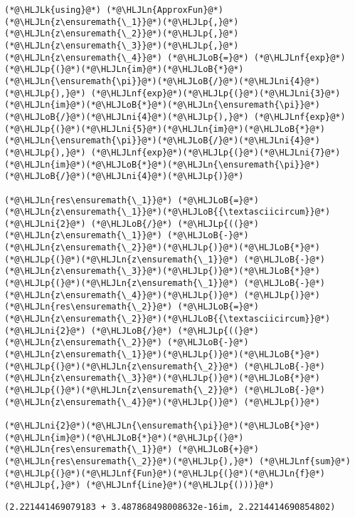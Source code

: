 \documentclass[12pt,a4paper]{article}
\newcommand{\HLJLk}[1]{\textcolor[RGB]{148,91,176}{\textbf{#1}}}
\newcommand{\HLJLn}[1]{#1}
\newcommand{\HLJLnf}[1]{\textcolor[RGB]{66,102,213}{#1}}
\newcommand{\HLJLni}[1]{\textcolor[RGB]{59,151,46}{#1}}
\newcommand{\HLJLoB}[1]{\textcolor[RGB]{102,102,102}{\textbf{#1}}}
\newcommand{\HLJLp}[1]{#1}
\begin{document}
\begin{lstlisting}
(*@\HLJLk{using}@*) (*@\HLJLn{ApproxFun}@*)
(*@\HLJLn{z\ensuremath{\_1}}@*)(*@\HLJLp{,}@*)(*@\HLJLn{z\ensuremath{\_2}}@*)(*@\HLJLp{,}@*)(*@\HLJLn{z\ensuremath{\_3}}@*)(*@\HLJLp{,}@*)(*@\HLJLn{z\ensuremath{\_4}}@*) (*@\HLJLoB{=}@*) (*@\HLJLnf{exp}@*)(*@\HLJLp{(}@*)(*@\HLJLn{im}@*)(*@\HLJLoB{*}@*)(*@\HLJLn{\ensuremath{\pi}}@*)(*@\HLJLoB{/}@*)(*@\HLJLni{4}@*)(*@\HLJLp{),}@*) (*@\HLJLnf{exp}@*)(*@\HLJLp{(}@*)(*@\HLJLni{3}@*)(*@\HLJLn{im}@*)(*@\HLJLoB{*}@*)(*@\HLJLn{\ensuremath{\pi}}@*)(*@\HLJLoB{/}@*)(*@\HLJLni{4}@*)(*@\HLJLp{),}@*) (*@\HLJLnf{exp}@*)(*@\HLJLp{(}@*)(*@\HLJLni{5}@*)(*@\HLJLn{im}@*)(*@\HLJLoB{*}@*)(*@\HLJLn{\ensuremath{\pi}}@*)(*@\HLJLoB{/}@*)(*@\HLJLni{4}@*)(*@\HLJLp{),}@*) (*@\HLJLnf{exp}@*)(*@\HLJLp{(}@*)(*@\HLJLni{7}@*)(*@\HLJLn{im}@*)(*@\HLJLoB{*}@*)(*@\HLJLn{\ensuremath{\pi}}@*)(*@\HLJLoB{/}@*)(*@\HLJLni{4}@*)(*@\HLJLp{)}@*)

(*@\HLJLn{res\ensuremath{\_1}}@*) (*@\HLJLoB{=}@*) (*@\HLJLn{z\ensuremath{\_1}}@*)(*@\HLJLoB{{\textasciicircum}}@*)(*@\HLJLni{2}@*) (*@\HLJLoB{/}@*) (*@\HLJLp{((}@*)(*@\HLJLn{z\ensuremath{\_1}}@*) (*@\HLJLoB{-}@*) (*@\HLJLn{z\ensuremath{\_2}}@*)(*@\HLJLp{)}@*)(*@\HLJLoB{*}@*)(*@\HLJLp{(}@*)(*@\HLJLn{z\ensuremath{\_1}}@*) (*@\HLJLoB{-}@*) (*@\HLJLn{z\ensuremath{\_3}}@*)(*@\HLJLp{)}@*)(*@\HLJLoB{*}@*)(*@\HLJLp{(}@*)(*@\HLJLn{z\ensuremath{\_1}}@*) (*@\HLJLoB{-}@*) (*@\HLJLn{z\ensuremath{\_4}}@*)(*@\HLJLp{)}@*) (*@\HLJLp{)}@*)
(*@\HLJLn{res\ensuremath{\_2}}@*) (*@\HLJLoB{=}@*) (*@\HLJLn{z\ensuremath{\_2}}@*)(*@\HLJLoB{{\textasciicircum}}@*)(*@\HLJLni{2}@*) (*@\HLJLoB{/}@*) (*@\HLJLp{((}@*)(*@\HLJLn{z\ensuremath{\_2}}@*) (*@\HLJLoB{-}@*) (*@\HLJLn{z\ensuremath{\_1}}@*)(*@\HLJLp{)}@*)(*@\HLJLoB{*}@*)(*@\HLJLp{(}@*)(*@\HLJLn{z\ensuremath{\_2}}@*) (*@\HLJLoB{-}@*) (*@\HLJLn{z\ensuremath{\_3}}@*)(*@\HLJLp{)}@*)(*@\HLJLoB{*}@*)(*@\HLJLp{(}@*)(*@\HLJLn{z\ensuremath{\_2}}@*) (*@\HLJLoB{-}@*) (*@\HLJLn{z\ensuremath{\_4}}@*)(*@\HLJLp{)}@*) (*@\HLJLp{)}@*)

(*@\HLJLni{2}@*)(*@\HLJLn{\ensuremath{\pi}}@*)(*@\HLJLoB{*}@*)(*@\HLJLn{im}@*)(*@\HLJLoB{*}@*)(*@\HLJLp{(}@*)(*@\HLJLn{res\ensuremath{\_1}}@*) (*@\HLJLoB{+}@*) (*@\HLJLn{res\ensuremath{\_2}}@*)(*@\HLJLp{),}@*) (*@\HLJLnf{sum}@*)(*@\HLJLp{(}@*)(*@\HLJLnf{Fun}@*)(*@\HLJLp{(}@*)(*@\HLJLn{f}@*)(*@\HLJLp{,}@*) (*@\HLJLnf{Line}@*)(*@\HLJLp{()))}@*)
\end{lstlisting}

\begin{lstlisting}
(2.221441469079183 + 3.487868498008632e-16im, 2.2214414690854802)
\end{lstlisting}
\end{document}
